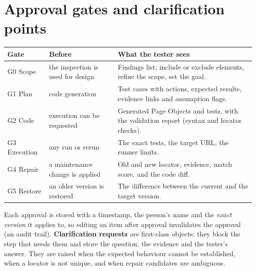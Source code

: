 \documentclass[11pt,a4paper]{article}
\begin{document}
\section{Approval gates and clarification points}
\label{sec:gates}
\begin{tabularx}{\linewidth}{@{}L{2.7cm}L{4.2cm}X@{}}
\toprule
\textbf{Gate} & \textbf{Before} & \textbf{What the tester sees} \\
\midrule
G0 Scope & the inspection is used for design & Findings list; include or exclude elements, refine the scope, set the goal. \\
G1 Plan & code generation & Test cases with actions, expected results, evidence links and assumption flags. \\
G2 Code & execution can be requested & Generated Page Objects and tests, with the validation report (syntax and locator checks). \\
G3 Execution & any run or rerun & The exact tests, the target URL, the runner limits. \\
G4 Repair & a maintenance change is applied & Old and new locator, evidence, match score, and the code diff. \\
G5 Restore & an older version is restored & The difference between the current and the target version. \\
\bottomrule
\end{tabularx}

\medskip
Each approval is stored with a timestamp, the person's name and the \emph{exact version} it applies to, so editing an item after approval invalidates the approval (an audit trail). \textbf{Clarification requests} are first-class objects: they block the step that needs them and store the question, the evidence and the tester's answer. They are raised when the expected behaviour cannot be established, when a locator is not unique, and when repair candidates are ambiguous.

\end{document}
